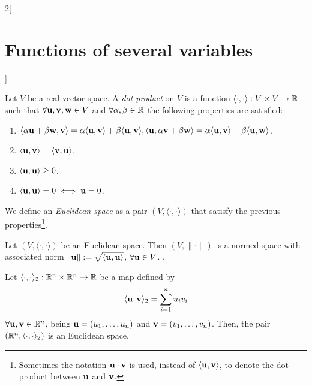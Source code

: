 \documentclass[../../../main.tex]{subfiles}
\begin{document}
\begin{multicols}{2}[\section{Functions of several variables}]
\begin{prop}
  \end{prop}
  \begin{definition}
    Let $V$ be a real vector space. A \textit{dot product} on $V$ is a function $\langle\cdot,\cdot\rangle:V\times V\rightarrow\mathbb{R} $ such that $\forall \boldsymbol{\mathrm{u}},\boldsymbol{\mathrm{v}},\boldsymbol{\mathrm{w}}\in V$ and $\forall\alpha,\beta\in\mathbb{R} $ the following properties are satisfied:
    \begin{enumerate}
      \item $\langle \alpha \boldsymbol{\mathrm{u}}+\beta \boldsymbol{\mathrm{w}},\boldsymbol{\mathrm{v}}\rangle=\alpha\langle \boldsymbol{\mathrm{u}},\boldsymbol{\mathrm{v}}\rangle+\beta\langle \boldsymbol{\mathrm{u}},\boldsymbol{\mathrm{v}}\rangle,\\\langle \boldsymbol{\mathrm{u}},\alpha \boldsymbol{\mathrm{v}}+\beta \boldsymbol{\mathrm{w}}\rangle=\alpha\langle \boldsymbol{\mathrm{u}},\boldsymbol{\mathrm{v}}\rangle+\beta\langle \boldsymbol{\mathrm{u}},\boldsymbol{\mathrm{w}}\rangle$.
      \item $\langle \boldsymbol{\mathrm{u}},\boldsymbol{\mathrm{v}}\rangle=\langle \boldsymbol{\mathrm{v}},\boldsymbol{\mathrm{u}}\rangle$.
      \item $\langle \boldsymbol{\mathrm{u}},\boldsymbol{\mathrm{u}}\rangle\geq 0$.
      \item $\langle \boldsymbol{\mathrm{u}},\boldsymbol{\mathrm{u}}\rangle=0\iff \boldsymbol{\mathrm{u}}=0$.
    \end{enumerate}
    We define an \textit{Euclidean space} as a pair $(V,\langle\cdot,\cdot\rangle)$ that satisfy the previous properties\footnote{Sometimes the notation $\boldsymbol{\mathrm{u}}\cdot \boldsymbol{\mathrm{v}}$ is used, instead of $\langle \boldsymbol{\mathrm{u}},\boldsymbol{\mathrm{v}}\rangle$, to denote the dot product between $\boldsymbol{\mathrm{u}}$ and $\boldsymbol{\mathrm{v}}$.}.
  \end{definition}
  \begin{prop}
    Let $(V,\langle\cdot,\cdot\rangle)$ be an Euclidean space. Then $(V,\|\cdot\|)$ is a normed space with associated norm $\|\boldsymbol{\mathrm{u}}\|:=\sqrt{\langle \boldsymbol{\mathrm{u}},\boldsymbol{\mathrm{u}}\rangle}$, $\forall \boldsymbol{\mathrm{u}}\in V$. .
  \end{prop}
  \begin{prop}
    Let $\langle\cdot,\cdot\rangle_2:\mathbb{R}^n\times\mathbb{R}^n\rightarrow\mathbb{R} $ be a map defined by $$\langle \boldsymbol{\mathrm{u}},\boldsymbol{\mathrm{v}}\rangle_2=\sum_{i=1}^nu_iv_i$$ $\forall \boldsymbol{\mathrm{u}},\boldsymbol{\mathrm{v}}\in \mathbb{R}^n$, being $\boldsymbol{\mathrm{u}}=(u_1,\ldots,u_n)$ and $\boldsymbol{\mathrm{v}}=(v_1,\ldots,v_n)$. Then, the pair $(\mathbb{R}^n,\langle\cdot,\cdot\rangle_2)$ is an Euclidean space.

\end{prop}
\end{multicols}
\end{document}
